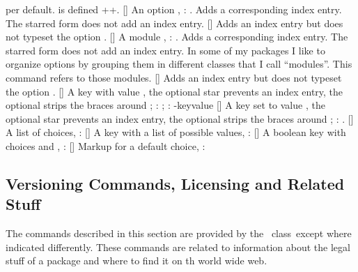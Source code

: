 \documentclass[load-preamble+]{cnltx-doc}
\begin{document}
\begin{commands}
     per default.   is defined
    \verbcode+\newarg[\code]\Marg{\{}{\}}+.
  [\sarg{}]
    An option , : .  Adds a
    corresponding index entry.  The starred form does not add an index entry.
  []
    Adds an index entry but does not typeset the option .
  [\sarg{}]
    A module , : .  Adds a
    corresponding index entry.  The starred form does not add an index entry.
    In some of my packages I like to organize options by grouping them in
    different classes that I call ``modules''.  This command refers to those
    modules.
  [\sarg{}]
    Adds an index entry but does not typeset the option .
  [\sarg\code{-}]
    A key  with value , the optional star prevents an
    index entry, the  optional \code{-} strips the braces around ;
    : ;
    \code{-}: \key-{key}{value}
  [\sarg\code{-}]
    A key  set to value , the
    optional star prevents an index entry, the  optional \code{-} strips the
    braces around ; :
    .
  []
    A list of choices, :
  []
    A key  with a list of possible values,
    :
  []
    A boolean key  with choices  and ,
    : 
  []
    Markup for a default choice,
    :
\end{commands}


\subsection{Versioning Commands, Licensing and Related  Stuff}\label{sec:cmds:versioning}

The commands described in this section are provided by the \cnltx\
class\byclass\ except where indicated differently.  These commands are related
to information about the legal stuff of a package and where to find it on th
world wide web.
\end{document}
